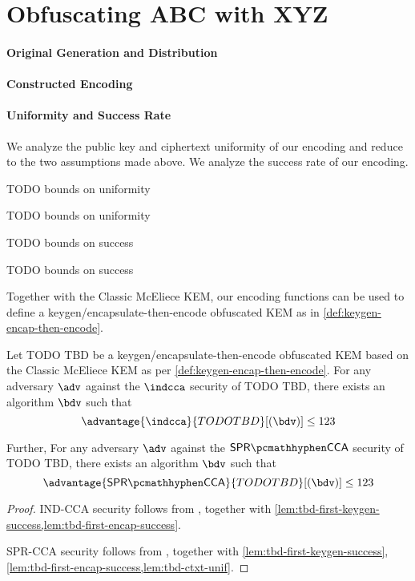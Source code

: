\section{Obfuscating ABC with XYZ} \label{sec:tbd}
\paragraph{Original Generation and Distribution}
\paragraph{Constructed Encoding}
\paragraph{Uniformity and Success Rate}

We analyze the public key and ciphertext uniformity of our encoding and reduce to the two assumptions made above. We analyze the success rate of our encoding.

\begin{lemma} \label{lem:tbd-pk-unif}
    TODO bounds on uniformity
\end{lemma}

\begin{lemma} \label{lem:tbd-ctxt-unif}
    TODO bounds on uniformity
\end{lemma}

\begin{lemma} \label{lem:tbd-first-keygen-success}
    TODO bounds on success
\end{lemma}

\begin{lemma}[[First-encap success probability of TODO TBD] \label{lem:tbd-first-encap-success}
    TODO bounds on success
\end{lemma}

Together with the Classic McEliece KEM, our encoding functions can be used to define a keygen/encapsulate-then-encode obfuscated KEM as in \cref{def:keygen-encap-then-encode}.

\begin{theorem}
    Let TODO TBD be a keygen/encapsulate-then-encode obfuscated KEM based on the Classic McEliece KEM as per \cref{def:keygen-encap-then-encode}. For any adversary $\adv$ against the $\indcca$ security of TODO TBD, there exists an algorithm $\bdv$ such that
    \[ \advantage{\indcca}{TODO TBD}[(\bdv)] \leq 123 \]

    Further,  For any adversary $\adv$ against the $\sprcca$ security of TODO TBD, there exists an algorithm $\bdv$ such that
    \[ \advantage{\sprcca}{TODO TBD}[(\bdv)] \leq 123 \]
\end{theorem}
\begin{proof}
    IND-CCA security follows from \cite[Theorem~2.12]{CCS:GunSteVei24}, together with \cref{lem:tbd-first-keygen-success,lem:tbd-first-encap-success}.
    
    SPR-CCA security follows from \cite[Theorem~2.13]{CCS:GunSteVei24}, together with \cref{lem:tbd-first-keygen-success}, \ref{lem:tbd-first-encap-success,lem:tbd-ctxt-unif}.
\end{proof}